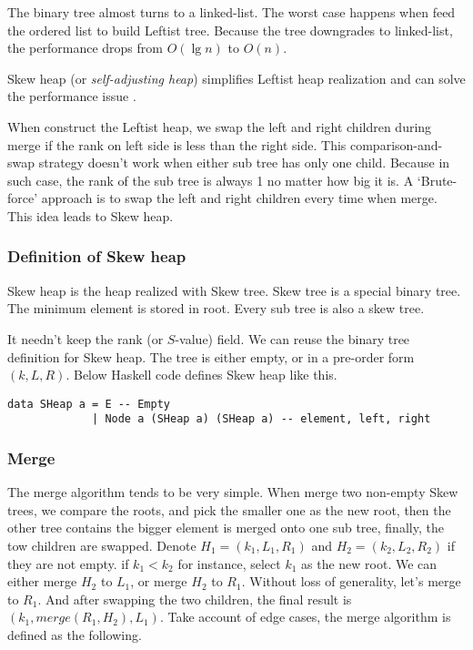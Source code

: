 \documentclass[UTF8]{article}
\begin{document}
The binary tree almost turns to a linked-list. The worst case
happens when feed the ordered list to build Leftist tree. Because the
tree downgrades to linked-list, the performance drops from $O(\lg n)$
to $O(n)$.

Skew heap (or {\em self-adjusting heap}) simplifies Leftist heap realization
and can solve the performance issue\cite{wiki-skew-heap} \cite{self-adjusting-heaps}.

When construct the Leftist heap, we swap the left and right children during merge
if the rank on left side is less than the right side. This comparison-and-swap strategy
doesn't work when either sub tree has only one child. Because
in such case, the rank of the sub tree is always 1 no matter how
big it is. A `Brute-force' approach is to swap the left and right children
every time when merge. This idea leads to Skew heap.

\subsubsection{Definition of Skew heap}

Skew heap is the heap realized with Skew tree. Skew tree is a special
binary tree. The minimum element is stored in root. Every sub tree is
also a skew tree.

It needn't keep the rank (or $S$-value) field. We can reuse the
binary tree definition for Skew heap. The tree is either empty,
or in a pre-order form $(k, L, R)$. Below Haskell code defines
Skew heap like this.

\lstset{language=Haskell}
\begin{lstlisting}
data SHeap a = E -- Empty
             | Node a (SHeap a) (SHeap a) -- element, left, right
\end{lstlisting}

\subsubsection{Merge}

The merge algorithm tends to be very simple.
When merge two non-empty Skew
trees, we compare the roots, and pick the smaller
one as the new root, then the other tree contains the bigger
element is merged onto one sub tree, finally,
the tow children are swapped. Denote $H_1 = (k_1, L_1, R_1)$
and $H_2 =(k_2, L_2, R_2)$ if they are not empty.
if $k_1 < k_2$ for instance, select $k_1$ as the new root. We can
either merge $H_2$ to $L_1$, or merge $H_2$ to $R_1$.
Without loss of generality, let's merge to $R_1$.
And after swapping the two children, the final result
is $(k_1, merge(R_1, H_2), L_1)$. Take account of
edge cases, the merge algorithm is defined as the
following.
\end{document}
